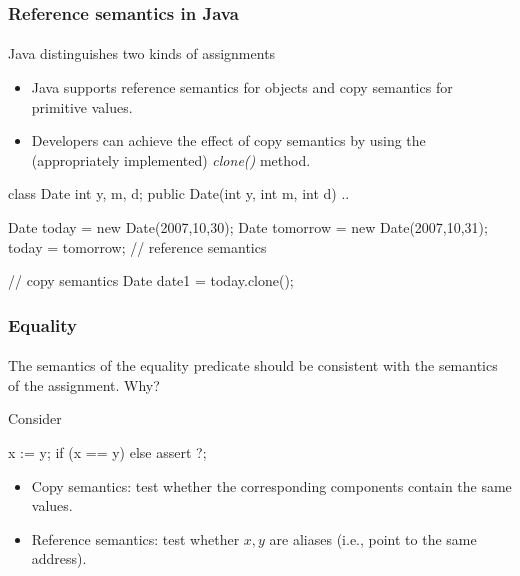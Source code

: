 \documentclass{beamer}
\begin{document}
\begin{frame}[fragile]
\frametitle{Reference semantics in Java}
\framesubtitle{}
Java distinguishes two kinds of assignments 
\begin{itemize}
\item Java supports reference semantics for objects and copy semantics
for primitive values.
\item Developers can achieve the effect of copy semantics by using
the (appropriately implemented) \textit{clone()} method.
\end{itemize}

\begin{java}
class Date 
{
    int y, m, d;
    public Date(int y, int m, int d) {..}
}

Date today    = new Date(2007,10,30);
Date tomorrow = new Date(2007,10,31);
today = tomorrow;    // reference semantics

// copy semantics 
Date date1 = today.clone();
\end{java}
\end{frame}



\begin{frame}[fragile]
\frametitle{Equality}
\framesubtitle{}
The semantics of the equality predicate should be consistent with
the semantics of the assignment. Why?

Consider
\begin{cplus3}
          x := y;
          if (x == y) {} else {assert ?;} 
\end{cplus3}
\begin{itemize}
\item Copy semantics: test whether the corresponding components contain
the same values.
\item Reference semantics: test whether $x,y$ are aliases (i.e., point
to the same address). 
\end{itemize}
\end{frame}
\end{document}
